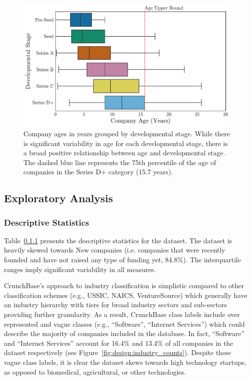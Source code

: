 \documentclass[../thesis/thesis.tex]{subfiles}
\begin{document}
\begin{figure}[!htb]
    \centering
    \includegraphics[width=\textwidth]{../figures/design/stages_ages}
    \caption{Company ages in years grouped by developmental stage. While there is significant variability in age for each developmental stage, there is a broad positive relationship between age and developmental stage. The dashed blue line represents the 75th percentile of the age of companies in the Series D+ category (15.7 years).}
    \label{fig:design:stages_ages}
\end{figure}

\subsection{Exploratory Analysis}

\subsubsection{Descriptive Statistics}

Table~\ref{} presents the descriptive statistics for the dataset. The dataset is heavily skewed towards New companies (i.e. companies that were recently founded and have not raised any type of funding yet, 84.8\%). The interquartile ranges imply significant variability in all measures.


CrunchBase's approach to industry classification is simplistic compared to other classification schemes (e.g., USSIC, NAICS, VentureSource) which generally have an industry hierarchy with tiers for broad industry sectors and sub-sectors providing further granularity. As a result, CrunchBase class labels include over represented and vague classes (e.g., ``Software'', ``Internet Services'') which could describe the majority of companies included in the database. In fact, ``Software'' and ``Internet Services'' account for 16.4\% and 13.4\% of all companies in the dataset respectively (see Figure~\ref{fig:design:industry_counts}). Despite these vague class labels, it is clear the dataset skews towards high technology startups, as opposed to biomedical, agricultural, or other technologies.
\end{document}
